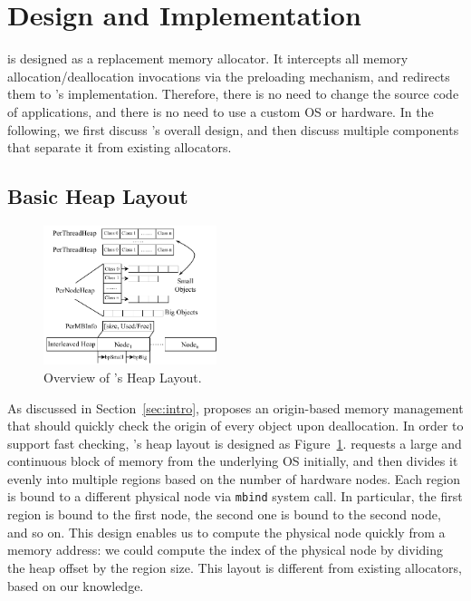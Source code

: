 \section{Design and Implementation}
\label{sec:implement}

\NM{} is designed as a replacement memory allocator. It intercepts all memory allocation/deallocation invocations via the preloading mechanism, and redirects them to \NM{}'s implementation. Therefore, there is no need to change the source code of applications, and there is no need to use a custom OS or hardware. In the following, we first discuss \NM{}'s overall design, and then discuss multiple components that separate it from existing allocators.

\subsection{Basic Heap Layout}
\label{sec:overview}

\begin{figure}[!ht]
\begin{center}
\includegraphics[width=0.45\textwidth]{figure/heaplayout1}
\end{center}
\caption{Overview of \NA{}'s Heap Layout.
\label{fig:overview}}
\end{figure}

As discussed in Section~\ref{sec:intro}, \NM{} proposes an origin-based memory management that should quickly check the origin of every object upon deallocation. In order to support fast checking, \NM{}'s heap layout is designed as  Figure~\ref{fig:overview}. \NM{} requests a large and continuous block of memory from the underlying OS initially, and then divides it evenly into multiple regions based on the number of hardware nodes. Each region is bound to a different physical node via \texttt{mbind} system call. In particular, the first region is bound to the first node, the second one is bound to the second node, and so on. This design enables us to compute the physical node quickly from a memory address: we could compute the index of the physical node by dividing the heap offset by the region size. This layout is different from existing allocators, based on our knowledge. 

